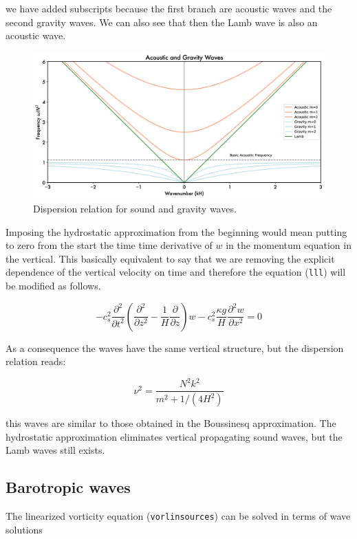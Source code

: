 we have added subscripts because the first branch are acoustic waves and
the second gravity waves. We can also see that then the Lamb wave is
also an acoustic wave.

\begin{figure}
 \centering
\includegraphics[width = .9 \textwidth, keepaspectratio]{./figs/GD/AcousticWaves.png}
\caption{Dispersion relation for sound and gravity waves.}
\label{fig:disp-rel-sound-gravity-waves}
\end{figure}


Imposing the hydrostatic approximation from the beginning would mean
putting to zero from the start the time time derivative of \(w\) in the
momentum equation in the vertical. This basically equivalent to say that
we are removing the explicit dependence of the vertical velocity on time
and therefore the equation (\texttt{lll}) will be modified as follows.

{\[-c_s^2\frac{\partial^{2} }{\partial t^{2}} \left(\frac{\partial^{2} }{\partial z^{2}}-\frac{1}{H}\frac{\partial }{\partial z}\right)w  -c_s^2 \frac{\kappa g}{H}\frac{\partial^{2} w}{\partial x^{2}} = 0\]}

As a consequence the waves have the same vertical structure, but the
dispersion relation reads:

\[\nu^2 = \frac{N^2k^2}{m^2 + 1 /(4H^2)}\]

this waves are similar to those obtained in the Boussinesq
approximation. The hydrostatic approximation eliminates vertical
propagating sound waves, but the Lamb waves still exists.

\subsection{Barotropic waves}\label{barotropic-waves}

The linearized vorticity equation (\texttt{vorlinsources}) can be solved
in terms of wave solutions

